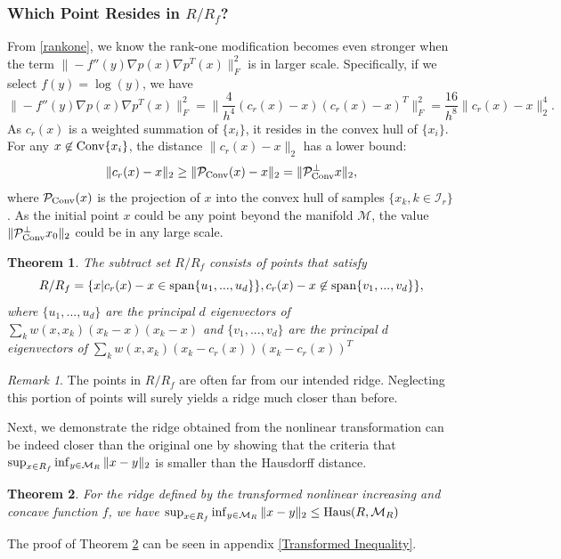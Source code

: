 \documentclass[aos,preprint]{imsart}
\newtheorem{theorem}{Theorem}[section]
\theoremstyle{remark}
\newtheorem*{remark}{Remark}
\begin{document}
\subsubsection{Which Point Resides in $R/R_f$?}
From \eqref{rankone}, we know the rank-one modification becomes even stronger when the term $\|-f''(y)\nabla p(x) \nabla p^T(x)\|_F^2$ is in larger scale. Specifically, if we select $f(y) = \log(y)$, we have
\[
\|-f''(y)\nabla p(x) \nabla p^T(x)\|_F^2 = \|\frac{4}{h^4}  (c_r(x) - x) (c_r(x) - x)^T\|_F^2 = \frac{16}{h^8} \|c_r(x)-x\|_2^4.
\]
As $c_r(x)$ is a weighted summation of $\{x_i\}$, it resides in the convex hull of $\{x_i\}$. For any $x\not \in {\rm Conv}\{x_i\}$, the distance $\|c_r(x) -x\|_2$ has a lower bound:
\[
\|c_r(x) -x\|_2 \geq \|{\mathcal P}_{\rm Conv} (x) -x\|_2 = \|{\mathcal P}^{\perp}_{\rm Conv} x\|_2,
\]
where ${\mathcal P}_{\rm Conv}(x)$ is the projection of $x$ into the convex hull of samples $\{x_k, k\in {\mathcal I}_r\}$. As the initial point $x$ could be any point beyond the manifold $\mathcal M$, the value $\|{\mathcal P}^{\perp}_{\rm Conv} x_0\|_2$ could be in any large scale.
\begin{theorem}{The subtract set $R/R_f$ consists of points that satisfy
\[
R/R_f = \{ x | c_r(x) - x \in {\rm span} \{u_1,...,u_d\}\}, c_r(x) - x \not \in {\rm span} \{v_1,...,v_d\}\},
\] 
where $\{u_1,...,u_d\}$ are the principal $d$ eigenvectors of $\sum_k w(x, x_k)(x_k-x)(x_k-x)$ and $\{v_1,...,v_d\}$ are the principal $d$ eigenvectors of $\sum_k w(x, x_k)(x_k-c_r(x))(x_k-c_r(x))^T$} 
\end{theorem}
\begin{remark}
The points in $R/R_f$ are often far from our intended ridge. Neglecting this portion of points will surely yields a ridge much closer than before.
\end{remark}
Next, we demonstrate the ridge obtained from the nonlinear transformation can be indeed closer than the original one by showing that the criteria that $\sup_{x\in R_f} \inf_{y\in {\cal M}_R} \|x-y\|_2$ is smaller than the Hausdorff distance.
\begin{theorem}\label{Transformed Inequality Theorem}
For the ridge defined by the transformed nonlinear increasing and concave function $f$, we have $\sup_{x\in R_f} \inf_{y\in {\cal M}_R} \|x-y\|_2 \leq {\rm Haus} (R, {\cal M}_{R})$
\end{theorem}
The proof of Theorem \ref{Transformed Inequality Theorem} can be seen in appendix \ref{Transformed Inequality}.
\end{document}
